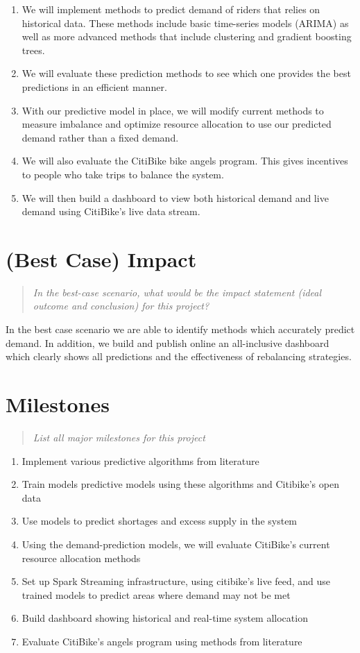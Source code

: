 \documentclass{proc}
\begin{document}
\begin{enumerate}
\item We will implement methods to predict demand of riders that relies on historical data. These methods include basic time-series models (ARIMA) as well as more advanced methods that include clustering and gradient boosting trees. 
\item We will evaluate these prediction methods to see which one provides the best predictions in an efficient manner.
\item With our predictive model in place, we will modify current methods to measure imbalance and optimize resource allocation to use our predicted demand rather than a fixed demand. 
\item We will also evaluate the CitiBike bike angels program. This gives incentives to people who take trips to balance the system. 
\item We will then build a dashboard to view both historical demand and live demand using CitiBike's live data stream.
\end{enumerate}

\section{(Best Case) Impact}
\begin{quote}
\emph{In the best-case scenario, what would be the impact statement (ideal outcome and conclusion) for this project?} 
\end{quote}

In the best case scenario we are able to identify methods which accurately predict demand. In addition, we build and publish online an all-inclusive dashboard which clearly shows all predictions and the effectiveness of rebalancing strategies. 

\section{Milestones}
\begin{quote}
\emph{List all major milestones for this project}
\end{quote}

\begin{enumerate}
  \item Implement various predictive algorithms from literature
  \item Train models predictive models using these algorithms and Citibike's open data 
  \item Use models to predict shortages and excess supply in the system
  \item Using the demand-prediction models, we will evaluate CitiBike's current resource allocation methods
  \item Set up Spark Streaming infrastructure, using citibike's live feed, and use trained models to predict areas where demand may not be met
  \item Build dashboard showing historical and real-time system allocation
  \item Evaluate CitiBike's angels program using methods from literature
\end{enumerate}
\end{document}
